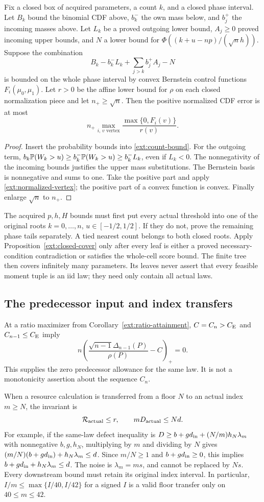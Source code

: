\begin{proposition}\label{ext:count-cell}
Fix a closed box of acquired parameters, a count $k$, and a closed
phase interval. Let $B_k$ bound the binomial CDF above, $b_k^-$ the own
mass below, and $b_j^+$ the incoming masses above. Let $L_k$ be a
proved outgoing lower bound, $A_j\ge0$ proved incoming upper bounds,
and $N$ a lower bound for $\Phi((k+u-np)/(\sqrt n h))$.
Suppose the combination
\[
 B_k-b_k^-L_k+\sum_{j>k}b_j^+A_j-N
\]
is bounded on the whole phase interval by convex Bernstein control
functions $F_i(\mu_0,\mu_1)$. Let $r>0$ be the affine lower bound for
$\rho$ on each closed normalization piece and let $n_+\ge\sqrt n$.
Then the positive normalized CDF error is at most
\[
 n_+\max_{i,\,v\text{ vertex}}
       \frac{\max\{0,F_i(v)\}}{r(v)}.
\]
\end{proposition}
\begin{proof}
Insert the probability bounds into \eqref{ext:count-bound}. For the outgoing
term, $b_k\mathbb P(W_k>u)\ge b_k^-\mathbb P(W_k>u)\ge b_k^-L_k$,
even if $L_k<0$. The nonnegativity of the incoming bounds justifies the
upper mass substitutions. The Bernstein basis is nonnegative and sums
to one. Take the positive part and apply \eqref{ext:normalized-vertex};
the positive part of a convex function is convex. Finally enlarge
$\sqrt n$ to $n_+$.
\end{proof}

The acquired $p,h,H$ bounds must first put every actual threshold into
one of the original roots $k=0,\ldots,n$, $u\in[-1/2,1/2]$.
If they do not, prove the remaining phase tails separately. A tied
nearest count belongs to both closed roots. Apply
Proposition~\ref{ext:closed-cover} only after every leaf is either a
proved necessary-condition contradiction or satisfies the whole-cell
score bound. The finite tree then covers infinitely many parameters.
Its leaves never assert that every feasible moment tuple is an iid law;
they need only contain all actual laws.

\subsection{The predecessor input and index transfers}
At a ratio maximizer from Corollary~\ref{ext:ratio-attainment},
$C=C_n>C_{\mathrm E}$ and $C_{n-1}\le C_{\mathrm E}$ imply
\[
 n\left(\frac{\sqrt{n-1}\Delta_{n-1}(P)}{\rho(P)}-C\right)_+=0.
\]
This supplies the zero predecessor allowance for the same law. It is
not a monotonicity assertion about the sequence $C_n$.

When a resource calculation is transferred from a floor $N$ to an actual
index $m\ge N$, the invariant is
\[
 \mathcal R_{\rm actual}\le r,\qquad mD_{\rm actual}\le Nd.
\]
For example, if the same-law defect inequality is
$D\ge b+g d_{\rm in}+(N/m)h_N\lambda_m$ with nonnegative
$b,g,h_N$, multiplying by $m$ and dividing by $N$ gives
$(m/N)(b+g d_{\rm in})+h_N\lambda_m\le d$.
Since $m/N\ge1$ and $b+g d_{\rm in}\ge0$, this implies
$b+g d_{\rm in}+h_N\lambda_m\le d$.
The noise is $\lambda_m=ms$, and cannot be replaced by $Ns$.
Every downstream bound must retain its original index interval.
In particular, $I/m\le\max\{I/40,I/42\}$ for a signed $I$ is a
valid floor transfer only on $40\le m\le42$.
